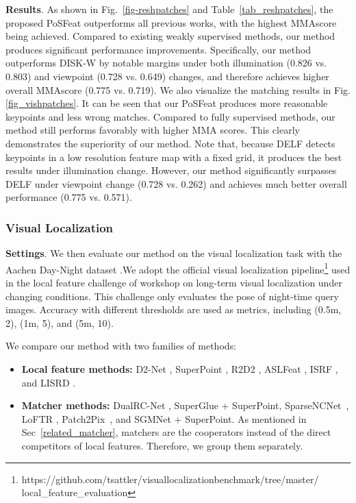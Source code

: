 \documentclass[10pt,twocolumn,letterpaper]{article}
\begin{document}
\noindent\textbf{Results}. 
As shown in Fig.~\ref{fig-reshpatches} and Table~\ref{tab_reshpatches}, the proposed PoSFeat outperforms all previous works, with the highest MMAscore being achieved. Compared to existing weakly supervised methods, our method produces significant performance improvements. Specifically, our method outperforms DISK-W by notable margins under both illumination (0.826 vs. 0.803) and viewpoint (0.728 vs. 0.649) changes, and therefore achieves higher overall MMAscore (0.775 vs. 0.719). We also visualize the matching results in Fig. \ref{fig_vishpatches}. It can be seen that our PoSFeat produces more reasonable keypoints and less wrong matches. Compared to fully supervised methods, our method still performs favorably with higher MMA scores. This clearly demonstrates the superiority of our method. Note that, because DELF detects keypoints in a low resolution feature map with a fixed grid, it produces the best results under illumination change. However, our method significantly surpasses DELF under viewpoint change (0.728 vs. 0.262) and achieves much better overall performance (0.775 vs. 0.571).


\subsubsection{Visual Localization}
\textbf{Settings}. We then evaluate our method on the visual localization task with the Aachen Day-Night dataset \cite{zhang2021reference}.We adopt the official visual localization pipeline\footnote{https://github.com/tsattler/visuallocalizationbenchmark/tree/master/ local\_feature\_evaluation} used in the local feature challenge of workshop on long-term visual localization under changing conditions. This challenge only evaluates the pose of night-time query images. Accuracy with different thresholds are used as metrics, including (0.5m, 2), (1m, 5), and (5m, 10).

We compare our method with two families of methods:

\begin{itemize}
    \item \textbf{Local feature methods:} D2-Net \cite{Dusmanu2019CVPR}, SuperPoint \cite{detone2018superpoint}, R2D2 \cite{revaud2019r2d2}, ASLFeat \cite{luo2020aslfeat}, ISRF \cite{melekhov2020image}, and LISRD \cite{pautrat2020online}. 
    \vspace{-0.25cm}
    
    \item \textbf{Matcher methods:}  DualRC-Net \cite{li2020dual}, SuperGlue \cite{sarlin2020superglue} + SuperPoint, SparseNCNet~\cite{rocco2020efficient}, LoFTR \cite{sunLoFTRDetectorFreeLocal2021}, Patch2Pix~\cite{zhou2021patch2pix}, and SGMNet \cite{chen2021learning} + SuperPoint. As mentioned in Sec~\ref{related_matcher}, matchers are the cooperators instead of the direct competitors of local features. Therefore, we group them separately.
\end{itemize}
\end{document}
